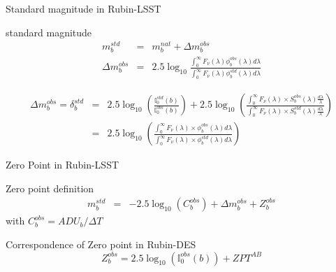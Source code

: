 \documentclass{beamer}
\begin{document}
\begin{frame}{Standard magnitude in Rubin-LSST}
\begin{alertblock}{standard magnitude}
\begin{eqnarray}
m_b^{std} & = & m_b^{nat} + \Delta m_b^{obs} \\
\Delta m_b^{obs} & = & 2.5 \log_{10} \frac{\int_0^\infty F_\nu(\lambda) \phi_b^{obs}(\lambda) d\lambda}{\int_0^\infty F_\nu(\lambda) \phi_b^{std}(\lambda) d\lambda}
\end{eqnarray}
\end{alertblock}
\begin{block}{}
{\small
\begin{eqnarray}
\Delta m_b^{obs} = \delta_b^{std} & = & 2.5 \log_{10}\left( \frac{\mathbb{I}_0^{std}(b)}{\mathbb{I}_0^{obs}(b)}\right) 
+ 2.5 \log_{10} 
	\left( 
	\frac{\int_0^\infty F_\nu(\lambda) \times S_b^{obs}(\lambda) \frac{d\lambda}{\lambda} }{\int_0^\infty F_\nu(\lambda) \times S_b^{std}(\lambda) \frac{d\lambda}{\lambda}} 
	\right) \nonumber \\
& = & 	2.5 \log_{10} 
	\left( 
	\frac{\int_0^\infty F_\nu(\lambda) \times \phi_b^{obs}(\lambda) d\lambda}{\int_0^\infty F_\nu(\lambda) \times \phi_b^{std}(\lambda) d\lambda} 
	\right) \nonumber	
\end{eqnarray}
}
\end{block}
\end{frame}




\begin{frame}{Zero Point in Rubin-LSST}
\begin{exampleblock}{Zero point definition}
\begin{eqnarray}
m_b^{std} & = & -2.5 \log_{10}(C_b^{obs}) + \Delta m_b^{obs} + Z_b^{obs}
\end{eqnarray}
with $C_b^{obs} = ADU_b/\Delta T$
\end{exampleblock}
\begin{alertblock}{Correspondence of Zero point in Rubin-DES}
\begin{equation}
Z_b^{obs} = 2.5\log_{10}\left(\mathbb{I}_0^{obs}(b)\right) + ZPT^{AB}
\end{equation}
\end{alertblock}
\end{frame}
\end{document}
